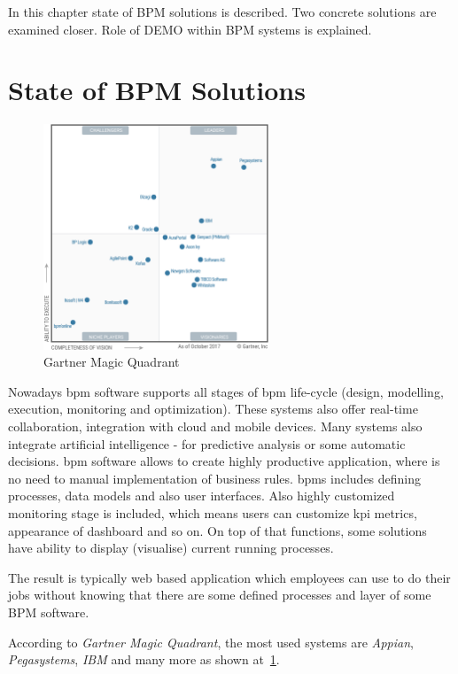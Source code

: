 In this chapter state of BPM solutions is described. Two concrete solutions are examined closer. Role of DEMO within BPM systems is explained. 
\section{State of BPM Solutions}
\begin{figure}[ht!]
	\centering
    \includegraphics[width=0.6\textwidth, keepaspectratio]{img/gartner-magic-quadrant.png}
    \caption{Gartner Magic Quadrant\cite{gartner-2017} }
    \label{fig:gartner-magic-quadrant}
\end{figure}

Nowadays \gls{bpm} software supports all stages of \gls{bpm} life-cycle (design, modelling, execution, monitoring and optimization). These systems also offer real-time collaboration, integration with cloud and mobile devices. Many systems also integrate artificial intelligence - for predictive analysis or some automatic decisions. \gls{bpm} software allows to create highly productive application, where is no need to manual implementation of business rules. \gls{bpms} includes defining processes, data models and also user interfaces. Also highly customized monitoring stage is included, which means users can customize \gls{kpi} metrics, appearance of dashboard and so on. On top of that functions, some solutions have ability to display (visualise) current running processes.  

The result is typically web based application which employees can use to do their jobs without knowing that there are some defined processes and layer of some BPM software. 

According to \textit{Gartner Magic Quadrant}\cite{gartner-2017}, the most used systems are \textit{Appian}, \textit{Pegasystems}, \textit{IBM} and many more as shown at~\cref{fig:gartner-magic-quadrant}.
